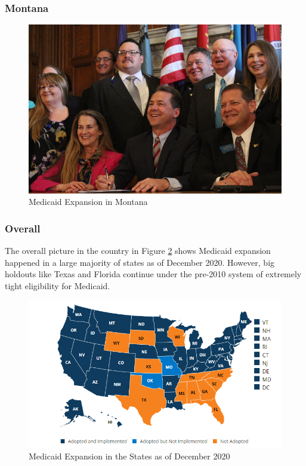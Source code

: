 \documentclass[
  oneside]{book}
\begin{document}
\hypertarget{montana}{%
\subsubsection{Montana}\label{montana}}

\begin{figure}
\includegraphics[width=0.99\linewidth]{Plots/Web/mt_medicaid_expansion} \caption{Medicaid Expansion in Montana}\label{fig:medicaid-expansion-mt}
\end{figure}

\hypertarget{overall}{%
\subsubsection{Overall}\label{overall}}

The overall picture in the country in Figure \ref{fig:medicaid-expansion-map} shows Medicaid expansion happened in a large majority of states as of December 2020. However, big holdouts like Texas and Florida continue under the pre-2010 system of extremely tight eligibility for Medicaid.

\begin{figure}
\includegraphics[width=0.99\linewidth]{Plots/Web/medicaid_expansion_map_2020} \caption{Medicaid Expansion in the States as of December 2020}\label{fig:medicaid-expansion-map}
\end{figure}
\end{document}
